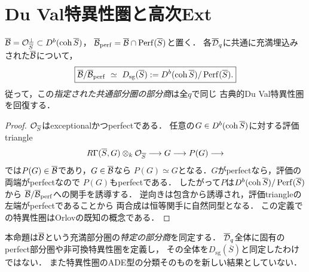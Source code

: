 \section{Du Val特異性圏と高次Ext}\label{sec:duval-singular-core}
\begin{proposition}[特異性圏の共通な部分商]\label{prop:duval-singularity-quotient}
$\overline{\mathcal B}=\mathcal O_{\overline S}^{\perp}\subset D^b(\operatorname{coh}\overline S)$，
$\overline{\mathcal B}_{\mathrm{perf}}=\overline{\mathcal B}\cap\operatorname{Perf}(\overline S)$と置く．
各$\overline{\mathcal D}_q$に共通に充満埋込みされた$\overline{\mathcal B}$について，
\[
\boxed{
\overline{\mathcal B}/\overline{\mathcal B}_{\mathrm{perf}}
\ \simeq\ D_{\mathrm{sg}}(\overline S)
:=D^b(\operatorname{coh}\overline S)/\operatorname{Perf}(\overline S).}
\]
従って，この\emph{指定された共通部分圏の部分商}は全$q$で同じ
古典的Du Val特異性圏を回復する．
\end{proposition}
\begin{proof}
$\mathcal O_{\overline S}$はexceptionalかつperfectである．
任意の$G\in D^b(\operatorname{coh}\overline S)$に対する評価triangle
\[
R\Gamma(\overline S,G)\otimes_k\mathcal O_{\overline S}
\longrightarrow G\longrightarrow P(G)\longrightarrow
\]
では$P(G)\in\overline{\mathcal B}$であり，$G\in\overline{\mathcal B}$なら
$P(G)\simeq G$となる．$G$がperfectなら，評価の両端がperfectなので
$P(G)$もperfectである．
したがって$P$は$D^b(\operatorname{coh}\overline S)/\operatorname{Perf}(\overline S)$から
$\overline{\mathcal B}/\overline{\mathcal B}_{\mathrm{perf}}$への関手を誘導する．
逆向きは包含から誘導され，評価triangleの左端がperfectであることから
両合成は恒等関手に自然同型となる．
この定義での特異性圏はOrlov\cite{OrlovSingularity}の既知の概念である．
\end{proof}
\begin{remark}
本命題は$\overline{\mathcal B}$という充満部分圏の\emph{特定の部分商}を同定する．
$\overline{\mathcal D}_q$全体に固有のperfect部分圏や非可換特異性圏を定義し，
その全体を$D_{\mathrm{sg}}(\overline S)$と同定したわけではない．
また特異性圏のADE型の分類そのものを新しい結果としていない．
\end{remark}

